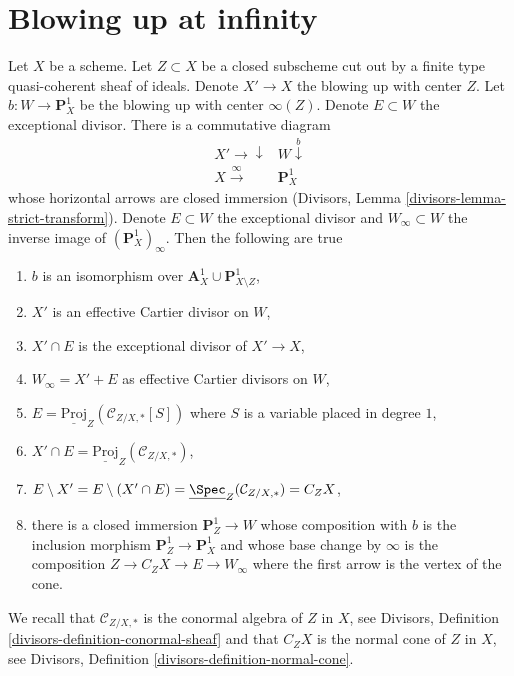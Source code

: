 \section{Blowing up at infinity}
\label{chow-section-blowup-Z-first}
Let $X$ be a scheme. Let $Z \subset X$ be a closed subscheme cut out
by a finite type quasi-coherent sheaf of ideals. Denote $X' \to X$
the blowing up with center $Z$. Let $b : W \to \mathbf{P}^1_X$ be the
blowing up with center $\infty(Z)$. Denote $E \subset W$ the exceptional
divisor. There is a commutative diagram
$$
\begin{array}{cc}X' \longrightarrow\downarrow & W \overset{b}{\downarrow} \\ X \overset{\infty}{\longrightarrow} & \mathbf{P}^1_X\end{array}
$$
whose horizontal arrows are closed immersion
(Divisors, Lemma \ref{divisors-lemma-strict-transform}). Denote $E \subset W$
the exceptional divisor and $W_\infty \subset W$ the inverse image
of $(\mathbf{P}^1_X)_\infty$. Then the following are true
\begin{enumerate}
\item $b$ is an isomorphism over
$\mathbf{A}^1_X \cup \mathbf{P}^1_{X \setminus Z}$,
\item $X'$ is an effective Cartier divisor on $W$,
\item $X' \cap E$ is the exceptional divisor of $X' \to X$,
\item $W_\infty = X' + E$ as effective Cartier divisors on $W$,
\item $E = \underline{\text{Proj}}_Z(\mathcal{C}_{Z/X, *}[S])$ where $S$
is a variable placed in degree $1$,
\item $X' \cap E = \underline{\text{Proj}}_Z(\mathcal{C}_{Z/X, *})$,
\item
\label{chow-item-cone-is-open}
$E \setminus X' = E \setminus (X' \cap E) =
\underline{\Spec}_Z(\mathcal{C}_{Z/X, *}) = C_ZX$,
\item
\label{chow-item-find-Z-in-blowup}
there is a closed immersion $\mathbf{P}^1_Z \to W$ whose
composition with $b$ is the inclusion morphism
$\mathbf{P}^1_Z \to \mathbf{P}^1_X$ and whose base change by $\infty$
is the composition $Z \to C_ZX \to E \to W_\infty$ where the first
arrow is the vertex of the cone.
\end{enumerate}
We recall that $\mathcal{C}_{Z/X, *}$ is the conormal algebra of $Z$ in $X$,
see Divisors, Definition \ref{divisors-definition-conormal-sheaf} and
that $C_ZX$ is the normal cone of $Z$ in $X$, see
Divisors, Definition \ref{divisors-definition-normal-cone}.

